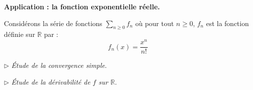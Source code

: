 \documentclass[a4paper,10pt]{report}
\begin{document}
\newpage

\textbf{Application : la fonction exponentielle réelle.}

\medskip

Considérons la série de fonctions $\sum_{n \geq 0}f_n$ où pour tout $n \geq 0$, $f_n$ est la fonction définie sur $\mathbb{R}$ par :
$$ f_n (x) = \frac{x^n}{n!}$$

\medskip

$\rhd$ \emph{Étude de la convergence simple}. 

%

\vspace{6cm}

\medskip

$\rhd$ \emph{Étude de la dérivabilité de $f$ sur $\mathbb{R}$}. 

%
%
%
\end{document}
